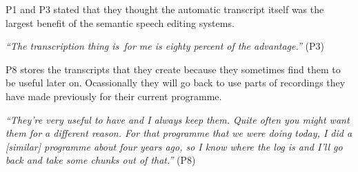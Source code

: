 P1 and P3 stated that they thought the automatic transcript itself was the largest benefit of the semantic speech
editing systems.

\textit{``The transcription thing is for me is eighty percent of the advantage.''} (P3)



P8 stores the transcripts that they create because they sometimes find them to be useful later on. Ocassionally they
will go back to use parts of recordings they have made previously for their current programme.

\textit{``They're very useful to have and I always keep them. Quite often you might want them for a different reason.
  For that programme that we were doing today, I did a [similar] programme about four years ago, so I know where the log
is and I'll go back and take some chunks out of that.''} (P8)












